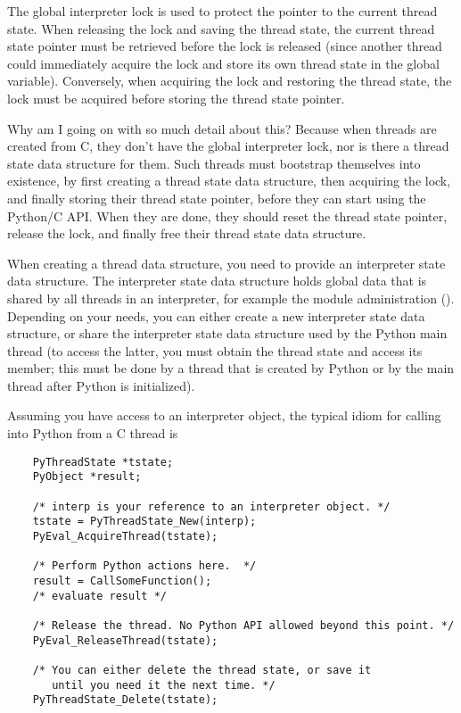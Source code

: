 The global interpreter lock is used to protect the pointer to the
current thread state.  When releasing the lock and saving the thread
state, the current thread state pointer must be retrieved before the
lock is released (since another thread could immediately acquire the
lock and store its own thread state in the global variable).
Conversely, when acquiring the lock and restoring the thread state,
the lock must be acquired before storing the thread state pointer.

Why am I going on with so much detail about this?  Because when
threads are created from C, they don't have the global interpreter
lock, nor is there a thread state data structure for them.  Such
threads must bootstrap themselves into existence, by first creating a
thread state data structure, then acquiring the lock, and finally
storing their thread state pointer, before they can start using the
Python/C API.  When they are done, they should reset the thread state
pointer, release the lock, and finally free their thread state data
structure.

When creating a thread data structure, you need to provide an
interpreter state data structure.  The interpreter state data
structure holds global data that is shared by all threads in an
interpreter, for example the module administration
().  Depending on your needs, you can either create
a new interpreter state data structure, or share the interpreter state
data structure used by the Python main thread (to access the latter,
you must obtain the thread state and access its  member;
this must be done by a thread that is created by Python or by the main
thread after Python is initialized).

Assuming you have access to an interpreter object, the typical idiom
for calling into Python from a C thread is

\begin{verbatim}
    PyThreadState *tstate;
    PyObject *result;

    /* interp is your reference to an interpreter object. */
    tstate = PyThreadState_New(interp);
    PyEval_AcquireThread(tstate);

    /* Perform Python actions here.  */
    result = CallSomeFunction();
    /* evaluate result */

    /* Release the thread. No Python API allowed beyond this point. */
    PyEval_ReleaseThread(tstate);

    /* You can either delete the thread state, or save it
       until you need it the next time. */
    PyThreadState_Delete(tstate);
\end{verbatim}

